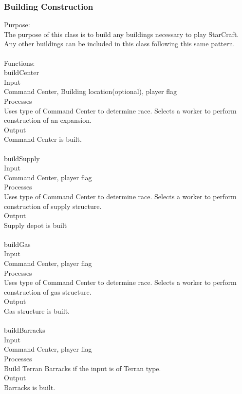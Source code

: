 \documentclass[10pt,letterpaper,onecolumn,draftclsnofoot]{IEEEtran}
\begin{document}
\subsubsection{Building Construction}
Purpose:\\
The purpose of this class is to build any buildings necessary to play StarCraft. Any other buildings can be included in this class following this same pattern.\\
\\
Functions:\\
buildCenter\\
Input\\
Command Center, Building location(optional), player flag\\
Processes\\
Uses type of Command Center to determine race. Selects a worker to perform construction of an expansion.\\
Output\\
Command Center is built.\\
\\
buildSupply\\
Input\\
Command Center, player flag\\
Processes\\
Uses type of Command Center to determine race. Selects a worker to perform construction of supply structure.\\
Output\\
Supply depot is built\\
\\
buildGas\\
Input\\
Command Center, player flag\\
Processes\\
Uses type of Command Center to determine race. Selects a worker to perform construction of gas structure.\\
Output\\
Gas structure is built.\\
\\
buildBarracks\\
Input\\
Command Center, player flag\\
Processes\\
Build Terran Barracks if the input is of Terran type.\\
Output\\
Barracks is built.\\
\\
\end{document}

